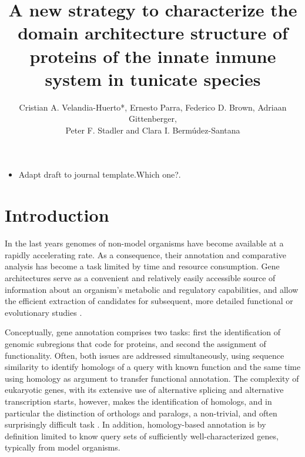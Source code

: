 \documentclass[11pt]{article}
\newcommand{\TODO}[1]{\begingroup\color{red}#1\endgroup}
\newcommand{\PFS}[1]{\begingroup\color{blue}#1\endgroup}
\begin{document}
\title{A new strategy to characterize the domain architecture structure of 
proteins of the innate inmune system in tunicate species}
\author{Cristian A. Velandia-Huerto*, Ernesto Parra, Federico D. 
Brown, Adriaan Gittenberger, \\ Peter F. Stadler and Clara I. 
Berm\'{u}dez-Santana}


\maketitle

\begin{itemize}
\item Adapt draft to journal template.\TODO{Which one?}. 
\end{itemize}

\section*{Introduction}

\PFS{In the last years genomes of non-model organisms have become available
  at a rapidly accelerating rate. As a consequence, their annotation and
  comparative analysis has become a task limited by time and resource
  consumption. Gene architectures serve as a convenient and relatively
  easily accessible source of information about an organism's metabolic and
  regulatory capabilities, and allow the efficient extraction of candidates
  for subsequent, more detailed functional or evolutionary studies
  \cite{aken2016ensembl,birney2004overview,ashburner2000gene,tatusov2000cog,tatusova2016ncbi}.}
  
  \PFS{Conceptually, gene annotation comprises two tasks: first the
  identification of genomic subregions that code for proteins, and second
  the assignment of functionality. Often, both issues are addressed
  simultaneously, using sequence similarity to identify homologs of a query
  with known function and the same time using homology as argument to
  transfer functional annotation. The complexity of eukaryotic genes, with
  its extensive use of alternative splicing and alternative transcription
  starts, however, makes the identification of homologs, and in particular
  the distinction of orthologs and paralogs, a non-trivial, and often
  surprisingly difficult task \cite{yandell2012}. In addition,
  homology-based annotation is by definition limited to know query sets of
  sufficiently well-characterized genes, typically from model organisms.}
\end{document}
